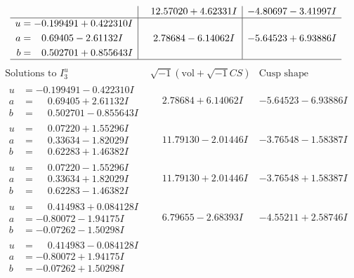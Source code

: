 \documentclass[1p]{elsarticle_modified}
\theoremstyle{definition}
\newcommand{\I}{\sqrt{-1}}
\begin{document}
$$\begin{array}{c|c|c}
 & \phantom{-}12.57020 + 4.62331 I & -4.80697 - 3.41997 I \\ \hline\begin{aligned}
u &= -0.199491 + 0.422310 I \\
a &= \phantom{-}0.69405 - 2.61132 I \\
b &= \phantom{-}0.502701 + 0.855643 I\end{aligned}
 & \phantom{-}2.78684 - 6.14062 I & -5.64523 + 6.93886 I\\
 \hline 
 \end{array}$$\newpage$$\begin{array}{c|c|c}  
\text{Solutions to }I^u_{3}& \I (\text{vol} + \sqrt{-1}CS) & \text{Cusp shape}\\
 \hline 
\begin{aligned}
u &= -0.199491 - 0.422310 I \\
a &= \phantom{-}0.69405 + 2.61132 I \\
b &= \phantom{-}0.502701 - 0.855643 I\end{aligned}
 & \phantom{-}2.78684 + 6.14062 I & -5.64523 - 6.93886 I \\ \hline\begin{aligned}
u &= \phantom{-}0.07220 + 1.55296 I \\
a &= \phantom{-}0.33634 - 1.82029 I \\
b &= \phantom{-}0.62283 + 1.46382 I\end{aligned}
 & \phantom{-}11.79130 - 2.01446 I & -3.76548 - 1.58387 I \\ \hline\begin{aligned}
u &= \phantom{-}0.07220 - 1.55296 I \\
a &= \phantom{-}0.33634 + 1.82029 I \\
b &= \phantom{-}0.62283 - 1.46382 I\end{aligned}
 & \phantom{-}11.79130 + 2.01446 I & -3.76548 + 1.58387 I \\ \hline\begin{aligned}
u &= \phantom{-}0.414983 + 0.084128 I \\
a &= -0.80072 - 1.94175 I \\
b &= -0.07262 - 1.50298 I\end{aligned}
 & \phantom{-}6.79655 - 2.68393 I & -4.55211 + 2.58746 I \\ \hline\begin{aligned}
u &= \phantom{-}0.414983 - 0.084128 I \\
a &= -0.80072 + 1.94175 I \\
b &= -0.07262 + 1.50298 I\end{aligned}

\end{array}$$
\end{document}
